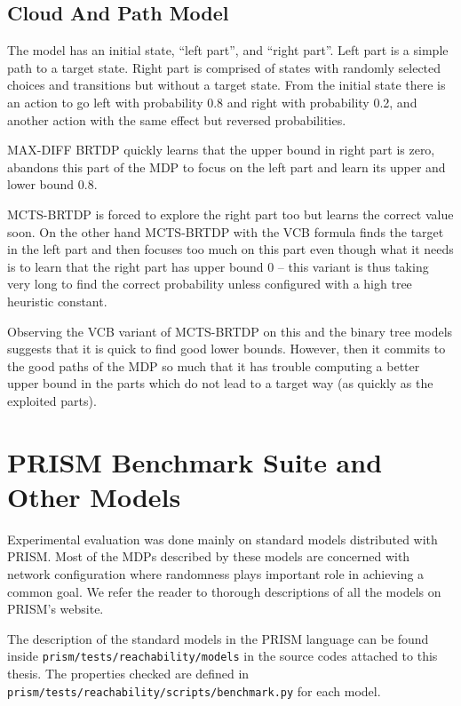 \subsection*{Cloud And Path Model}

The model has an initial state,
``left part'', and ``right part''. Left part is a simple path to a
target state. Right part is comprised of states with randomly selected
choices and transitions but without a target state.
From the initial state there is an action to go left with probability
0.8 and right with probability 0.2, and another action with the same
effect but reversed probabilities.

MAX-DIFF BRTDP quickly learns that the upper bound in right part is
zero, abandons this part of the MDP to focus on the left part and learn
its upper and lower bound 0.8.

MCTS-BRTDP is forced to explore the right part too but learns the
correct value soon. On the other hand MCTS-BRTDP with the VCB formula
finds the target in the left part and then focuses too much on this part
even though what it needs is to learn that the right part has upper
bound 0 -- this variant is thus taking very long to find the correct
probability unless configured with a high tree heuristic constant.

Observing the VCB variant of MCTS-BRTDP on this and the binary tree
models suggests that it is quick to find good lower bounds. However,
then it commits to the good paths of the MDP so much that it has trouble
computing a better upper bound in the parts which do not lead to a
target way (as quickly as the exploited parts).

\section{PRISM Benchmark Suite and Other Models}

Experimental evaluation was done mainly on standard models
distributed with PRISM. Most of the MDPs described by these models are
concerned with network configuration where randomness plays important
role in achieving a common goal.
We
refer the reader to thorough descriptions of all the models on PRISM's
website.

The description of the standard models in the PRISM language can be
found inside \verb|prism/tests/reachability/models| in the source codes
attached to this thesis. The properties checked are defined in
\verb|prism/tests/reachability/scripts/benchmark.py| for each model.

